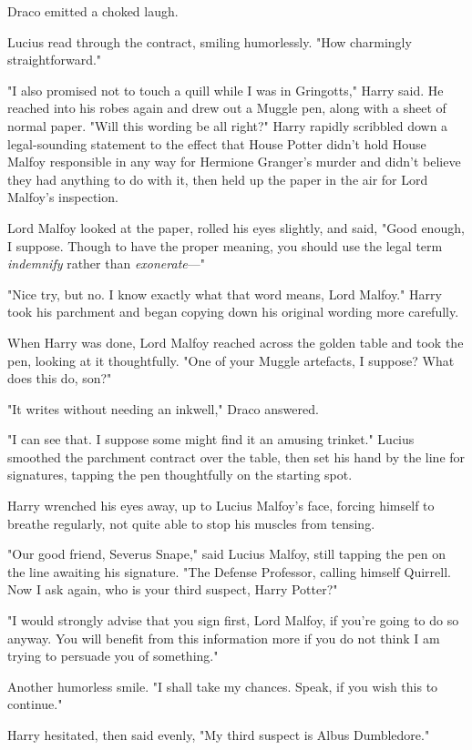 Draco emitted a choked laugh.

Lucius read through the contract, smiling humorlessly. "How charmingly 
straightforward."

"I also promised not to touch a quill while I was in Gringotts," Harry said. He 
reached into his robes again and drew out a Muggle pen, along with a sheet of 
normal paper. "Will this wording be all right?" Harry rapidly scribbled down a 
legal-sounding statement to the effect that House Potter didn't hold House 
Malfoy responsible in any way for Hermione Granger's murder and didn't believe 
they had anything to do with it, then held up the paper in the air for Lord 
Malfoy's inspection.

Lord Malfoy looked at the paper, rolled his eyes slightly, and said, "Good 
enough, I suppose. Though to have the proper meaning, you should use the legal 
term \emph{indemnify} rather than \emph{exonerate}---"

"Nice try, but no. I know exactly what that word means, Lord Malfoy." Harry 
took his parchment and began copying down his original wording more carefully.

When Harry was done, Lord Malfoy reached across the golden table and took the 
pen, looking at it thoughtfully. "One of your Muggle artefacts, I suppose? What 
does this do, son?"

"It writes without needing an inkwell," Draco answered.

"I can see that. I suppose some might find it an amusing trinket." Lucius 
smoothed the parchment contract over the table, then set his hand by the line 
for signatures, tapping the pen thoughtfully on the starting spot.

Harry wrenched his eyes away, up to Lucius Malfoy's face, forcing himself to 
breathe regularly, not quite able to stop his muscles from tensing.

"Our good friend, Severus Snape," said Lucius Malfoy, still tapping the pen on 
the line awaiting his signature. "The Defense Professor, calling himself 
Quirrell. Now I ask again, who is your third suspect, Harry Potter?"

"I would strongly advise that you sign first, Lord Malfoy, if you're going to 
do so anyway. You will benefit from this information more if you do not think I 
am trying to persuade you of something."

Another humorless smile. "I shall take my chances. Speak, if you wish this to 
continue."

Harry hesitated, then said evenly, "My third suspect is Albus Dumbledore."

